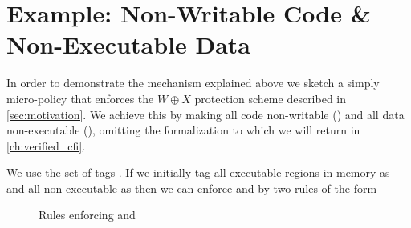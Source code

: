 \section{Example:
  Non-Writable Code \& Non-Executable Data}
\label{sec:nwc_nxd}




In order to demonstrate the mechanism explained above we sketch a
simply micro-policy that enforces the $W \oplus X$ protection scheme
described in \cref{sec:motivation}. We achieve this by making all code
non-writable (\NWC) and all data non-executable (\NXD), omitting the
formalization to which we will return in \cref{ch:verified_cfi}.

We use the set of tags \TAGS{\DATA,\INSTRname}. If we initially tag
all executable regions in memory as \INSTRname and all non-executable
as \DATAname then we can enforce \NWC and \NXD by two rules of the form

\begin{figure}[htb!]
\bigskip

\bigskip

\caption{Rules enforcing \NWC and \NXD}
\end{figure}

